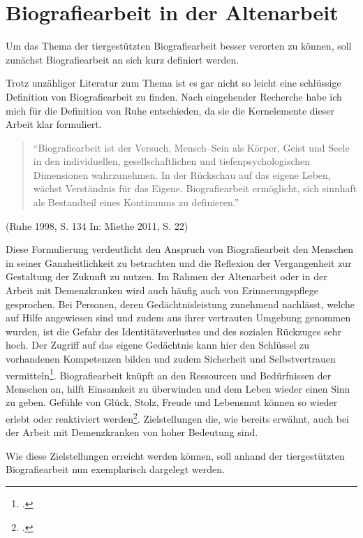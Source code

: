 \section{Biografiearbeit in der Altenarbeit}
\label{sec:k3_BiografiearbeitInDerAltenarbeit}

Um das Thema der tiergestützten Biografiearbeit besser verorten zu können, soll zunächst Biografiearbeit an sich kurz definiert werden. 

Trotz unzähliger Literatur zum Thema ist es gar nicht so leicht eine schlüssige Definition von Biografiearbeit zu finden. Nach eingehender Recherche habe ich mich für die Definition von Ruhe entschieden, da sie die Kernelemente dieser Arbeit klar formuliert.

\begin{quotation}
"`Biografiearbeit ist der Versuch, Mensch--Sein als Körper, Geist und Seele in den individuellen, gesellschaftlichen und tiefenpsychologischen Dimensionen wahrzunehmen. In der Rückschau auf das eigene Leben, wächst Verständnis für das Eigene. Biografiearbeit ermöglicht, sich sinnhaft als Bestandteil eines Kontinuums zu definieren."'
\end{quotation}

\begin{flushright}
(Ruhe 1998, S. 134 In: Miethe 2011, S. 22)
\end{flushright}

Diese Formulierung verdeutlicht den Anspruch von Biografiearbeit den Menschen in seiner Ganzheitlichkeit zu betrachten und die Reflexion der Vergangenheit zur Gestaltung der Zukunft zu nutzen.
Im Rahmen der Altenarbeit oder in der Arbeit mit Demenzkranken wird auch häufig auch von Erinnerungspflege gesprochen. Bei Personen, deren Gedächtnisleistung zunehmend nachlässt, welche auf Hilfe angewiesen sind und zudem aus ihrer vertrauten Umgebung genommen wurden, ist die Gefahr des Identitätsverlustes und des sozialen Rückzuges sehr hoch. Der Zugriff auf das eigene Gedächtnis kann hier den Schlüssel zu vorhandenen Kompetenzen bilden und zudem Sicherheit und Selbstvertrauen vermitteln\footcite[25]{Giruc2011}. Biografiearbeit knüpft an den Ressourcen und Bedürfnissen der Menschen an, hilft Einsamkeit zu überwinden und dem Leben wieder einen Sinn zu geben. Gefühle von Glück, Stolz, Freude und Lebensmut können so wieder erlebt oder reaktiviert werden\footcite[75]{Schwarz2009}. Zielstellungen die, wie bereits erwähnt, auch bei der Arbeit mit Demenzkranken von hoher Bedeutung sind. 

Wie diese Zielstellungen erreicht werden können, soll anhand der tiergestützten Biografiearbeit nun exemplarisch dargelegt werden.